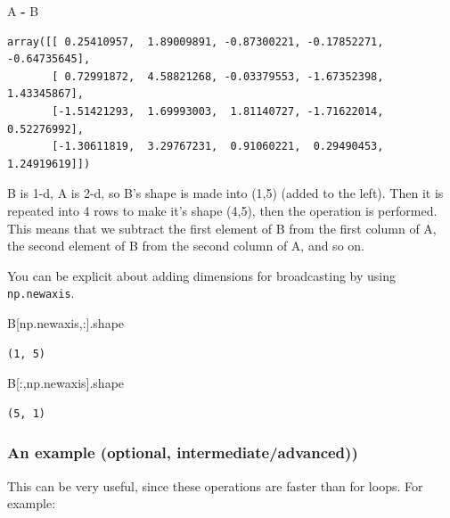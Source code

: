 \documentclass[
  letterpaper,
]{scrbook}
\newenvironment{Shaded}{\begin{snugshade}}{\end{snugshade}}
\newcommand{\NormalTok}[1]{#1}
\newcommand{\OperatorTok}[1]{\textcolor[rgb]{0.81,0.36,0.00}{\textbf{#1}}}
\begin{document}
\begin{Shaded}
\begin{Highlighting}[]
\NormalTok{A }\OperatorTok{-}\NormalTok{ B}
\end{Highlighting}
\end{Shaded}

\begin{verbatim}
array([[ 0.25410957,  1.89009891, -0.87300221, -0.17852271, -0.64735645],
       [ 0.72991872,  4.58821268, -0.03379553, -1.67352398,  1.43345867],
       [-1.51421293,  1.69993003,  1.81140727, -1.71622014,  0.52276992],
       [-1.30611819,  3.29767231,  0.91060221,  0.29490453,  1.24919619]])
\end{verbatim}

B is 1-d, A is 2-d, so B's shape is made into (1,5) (added to the left). Then it is repeated into 4 rows to make it's shape (4,5), then the operation is performed. This means that we subtract the first element of B from the first column of A, the second element of B from the second column of A, and so on.

You can be explicit about adding dimensions for broadcasting by using \texttt{np.newaxis}.

\begin{Shaded}
\begin{Highlighting}[]
\NormalTok{B[np.newaxis,:].shape}
\end{Highlighting}
\end{Shaded}

\begin{verbatim}
(1, 5)
\end{verbatim}

\begin{Shaded}
\begin{Highlighting}[]
\NormalTok{B[:,np.newaxis].shape}
\end{Highlighting}
\end{Shaded}

\begin{verbatim}
(5, 1)
\end{verbatim}

\hypertarget{an-example-optional-intermediateadvanced}{%
\subsubsection{An example (optional, intermediate/advanced))}\label{an-example-optional-intermediateadvanced}}

This can be very useful, since these operations are faster than for loops. For example:
\end{document}
